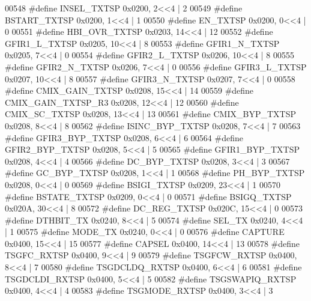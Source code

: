\begin{DoxyCode}
00548 \textcolor{preprocessor}{#define INSEL\_TXTSP 0x0200, 2<<4 |  2}
00549 \textcolor{preprocessor}{#define BSTART\_TXTSP 0x0200, 1<<4 |  1}
00550 \textcolor{preprocessor}{#define EN\_TXTSP 0x0200, 0<<4 |  0}
00551 \textcolor{preprocessor}{#define HBI\_OVR\_TXTSP 0x0203, 14<<4 |  12}
00552 \textcolor{preprocessor}{#define GFIR1\_L\_TXTSP 0x0205, 10<<4 |  8}
00553 \textcolor{preprocessor}{#define GFIR1\_N\_TXTSP 0x0205, 7<<4 |  0}
00554 \textcolor{preprocessor}{#define GFIR2\_L\_TXTSP 0x0206, 10<<4 |  8}
00555 \textcolor{preprocessor}{#define GFIR2\_N\_TXTSP 0x0206, 7<<4 |  0}
00556 \textcolor{preprocessor}{#define GFIR3\_L\_TXTSP 0x0207, 10<<4 |  8}
00557 \textcolor{preprocessor}{#define GFIR3\_N\_TXTSP 0x0207, 7<<4 |  0}
00558 \textcolor{preprocessor}{#define CMIX\_GAIN\_TXTSP 0x0208, 15<<4 |  14}
00559 \textcolor{preprocessor}{#define CMIX\_GAIN\_TXTSP\_R3 0x0208, 12<<4 |  12}
00560 \textcolor{preprocessor}{#define CMIX\_SC\_TXTSP 0x0208, 13<<4 |  13}
00561 \textcolor{preprocessor}{#define CMIX\_BYP\_TXTSP 0x0208, 8<<4 |  8}
00562 \textcolor{preprocessor}{#define ISINC\_BYP\_TXTSP 0x0208, 7<<4 |  7}
00563 \textcolor{preprocessor}{#define GFIR3\_BYP\_TXTSP 0x0208, 6<<4 |  6}
00564 \textcolor{preprocessor}{#define GFIR2\_BYP\_TXTSP 0x0208, 5<<4 |  5}
00565 \textcolor{preprocessor}{#define GFIR1\_BYP\_TXTSP 0x0208, 4<<4 |  4}
00566 \textcolor{preprocessor}{#define DC\_BYP\_TXTSP 0x0208, 3<<4 |  3}
00567 \textcolor{preprocessor}{#define GC\_BYP\_TXTSP 0x0208, 1<<4 |  1}
00568 \textcolor{preprocessor}{#define PH\_BYP\_TXTSP 0x0208, 0<<4 |  0}
00569 \textcolor{preprocessor}{#define BSIGI\_TXTSP 0x0209, 23<<4 |  1}
00570 \textcolor{preprocessor}{#define BSTATE\_TXTSP 0x0209, 0<<4 |  0}
00571 \textcolor{preprocessor}{#define BSIGQ\_TXTSP 0x020A, 30<<4 |  8}
00572 \textcolor{preprocessor}{#define DC\_REG\_TXTSP 0x020C, 15<<4 |  0}
00573 \textcolor{preprocessor}{#define DTHBIT\_TX 0x0240, 8<<4 |  5}
00574 \textcolor{preprocessor}{#define SEL\_TX 0x0240, 4<<4 |  1}
00575 \textcolor{preprocessor}{#define MODE\_TX 0x0240, 0<<4 |  0}
00576 \textcolor{preprocessor}{#define CAPTURE 0x0400, 15<<4 |  15}
00577 \textcolor{preprocessor}{#define CAPSEL 0x0400, 14<<4 |  13}
00578 \textcolor{preprocessor}{#define TSGFC\_RXTSP 0x0400, 9<<4 |  9}
00579 \textcolor{preprocessor}{#define TSGFCW\_RXTSP 0x0400, 8<<4 |  7}
00580 \textcolor{preprocessor}{#define TSGDCLDQ\_RXTSP 0x0400, 6<<4 |  6}
00581 \textcolor{preprocessor}{#define TSGDCLDI\_RXTSP 0x0400, 5<<4 |  5}
00582 \textcolor{preprocessor}{#define TSGSWAPIQ\_RXTSP 0x0400, 4<<4 |  4}
00583 \textcolor{preprocessor}{#define TSGMODE\_RXTSP 0x0400, 3<<4 |  3}

\end{DoxyCode}
